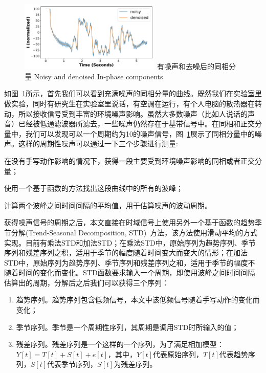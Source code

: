 \begin{figure}[!htp]
  \centering
  \includegraphics[width=0.6\textwidth]{figure/noisy-I.pdf}
  \bicaption
    {有噪声和去噪后的同相分量}
    {Noisy and denoised In-phase components}
  \label{fig:noisy-denoised-component}
\end{figure}
如图~\ref{fig:noisy-denoised-component}所示，首先我们可以看到充满噪声的同相分量的曲线。既然我们在实验室里做实验，同时有研究生在实验室里说话，有空调在运行，有个人电脑的散热器在转动，所以接收信号受到丰富的环境噪声影响。虽然大多数噪声（比如人说话的声音）已经被低通滤波器所滤去，一些噪声仍然存在于基带信号中。在同相和正交分量中，我们可以发现可以一个周期约为10的噪声信号，图~\ref{fig:noisy-denoised-component}展示了同相分量中的噪声。这样的周期性噪声可以通过一下三个步骤进行测量:
\begin{enumerate*}[label=(\arabic*)]
    \item 在没有手写动作影响的情况下，获得一段主要受到环境噪声影响的同相或者正交分量；
    \item 使用一个基于函数的方法找出这段曲线中的所有的波峰；
    \item 计算两个波峰之间时间间隔的平均值，用于估算噪声的波动周期。
\end{enumerate*}
获得噪声信号的周期之后，本文直接在时域信号上使用另外一个基于函数的趋势季节分解(Trend-Seasonal Decomposition, STD)~\cite{cleveland1990stl}方法，该方法使用滑动平均的方式实现。目前有乘法STD和加法STD；在乘法STD中，原始序列为趋势序列、季节序列和残差序列之积，适用于季节的幅度随着时间变大而变大的情形；在加法STD中，原始序列为趋势序列、季节序列和残差序列之和，适用于季节的幅度不随着时间的变化而变化。STD函数要求输入一个周期，即使用波峰之间时间间隔估算出的周期，分解后之后我们可以获得三个序列：
\begin{enumerate}[label=(\arabic*)]
    \item 趋势序列。趋势序列包含低频信号，本文中该低频信号随着手写动作的变化而变化；
    \item 季节序列。季节是一个周期性序列，其周期是调用STD时所输入的值；
    \item 残差序列。残差序列是一个这样的一个序列，为了满足相加模型：$Y[t] = T[t] + S[t] + e[t]$，其中，$Y[t]$代表原始序列，$T[t]$代表趋势序列，$S[t]$代表季节序列，$S[t]$为残差序列。
\end{enumerate}
